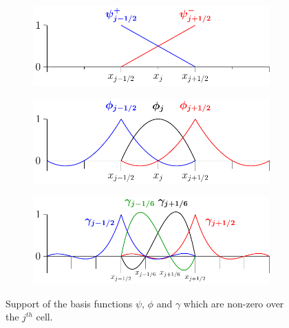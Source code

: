 \documentclass[times]{elsarticle}
\begin{document}
\begin{figure}
	\centering
		\begin{subfigure}{0.6\textwidth}
			\includegraphics[width=\textwidth]{./Figures/Diagrams/FEMbasis/P1/P1NN-figure0.pdf}
			\subcaption{$\psi$}
			\vspace{0.5cm}
		\end{subfigure}
		\begin{subfigure}{0.6\textwidth}
			\includegraphics[width=\textwidth]{./Figures/Diagrams/FEMbasis/P2/P2N-figure0.pdf}
			\subcaption{$\phi$}
			\vspace{0.5cm}
		\end{subfigure}
		\begin{subfigure}{0.6\textwidth}
			\includegraphics[width=\textwidth]{./Figures/Diagrams/FEMbasis/P3/P3-figure0.pdf}
			\subcaption{$\gamma$}
			\vspace{0.5cm}
		\end{subfigure}
	\caption{Support of the basis functions $\psi$, $\phi$ and $\gamma$ which are non-zero over the $j^{th}$ cell.}
	\label{fig:P1DiscBasis}
\end{figure}
\end{document}
